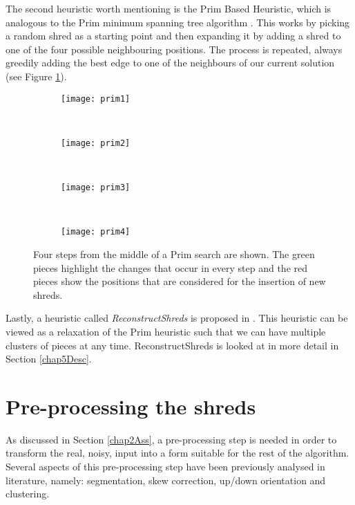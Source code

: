 The second heuristic worth mentioning is the Prim Based Heuristic, which is analogous to the Prim minimum spanning tree algorithm \cite{P40}. This works by picking a random shred as a starting point and then expanding it by adding a shred to one of the four possible neighbouring positions. The process is repeated, always greedily adding the best edge to one of the neighbours of our current solution (see Figure \ref{fig:prim}). 
\begin{figure}[H]
        \centering
        \begin{subfigure}[b]{0.45\textwidth}
                \centering
                \texttt{[image: prim1]}
                \vspace{0.3em}
        \end{subfigure}
        ~ 
        \begin{subfigure}[b]{0.45\textwidth}
                \centering
                \texttt{[image: prim2]}
                \vspace{0.3em}
        \end{subfigure}
        ~ 
        \begin{subfigure}[b]{0.45\textwidth}
                \centering
                \texttt{[image: prim3]}
        \end{subfigure}
        ~ 
        \begin{subfigure}[b]{0.45\textwidth}
                \centering
                \texttt{[image: prim4]}
        \end{subfigure}
        \caption{Four steps from the middle of a Prim search are shown. The green pieces highlight the changes that occur in every step and the red pieces show the positions that are considered for the insertion of new shreds.}
        \label{fig:prim}
\end{figure}
Lastly, a heuristic called \emph{ReconstructShreds} is proposed in \cite{P2}. This heuristic can be viewed as a relaxation of the Prim heuristic such that we can have multiple clusters of pieces at any time. ReconstructShreds is looked at in more detail in Section \ref{chap5Desc}.

\section{Pre-processing the shreds}
\label{chap3PP}
As discussed in Section \ref{chap2Ass}, a pre-processing step is needed in order to transform the real, noisy, input into a form suitable for the rest of the algorithm. Several aspects of this pre-processing step have been previously analysed in literature, namely: segmentation, skew correction, up/down orientation and clustering.

